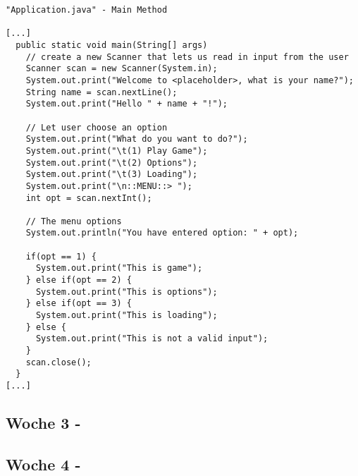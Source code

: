\begin{verbatim}
"Application.java" - Main Method

[...]
  public static void main(String[] args)
    // create a new Scanner that lets us read in input from the user
    Scanner scan = new Scanner(System.in);
    System.out.print("Welcome to <placeholder>, what is your name?");
    String name = scan.nextLine();
    System.out.print("Hello " + name + "!");
    
    // Let user choose an option
    System.out.print("What do you want to do?");
    System.out.print("\t(1) Play Game");
    System.out.print("\t(2) Options");
    System.out.print("\t(3) Loading");
    System.out.print("\n::MENU::> ");
    int opt = scan.nextInt();
    
    // The menu options
    System.out.println("You have entered option: " + opt);
    
    if(opt == 1) {
      System.out.print("This is game");
    } else if(opt == 2) {
      System.out.print("This is options");
    } else if(opt == 3) {
      System.out.print("This is loading");
    } else {
      System.out.print("This is not a valid input");
    }
    scan.close();
  }
[...]

\end{verbatim}
\subsection{Woche 3 - }
\label{ch:weekthree}
\subsection{Woche 4 - }
\label{ch:weekfour}